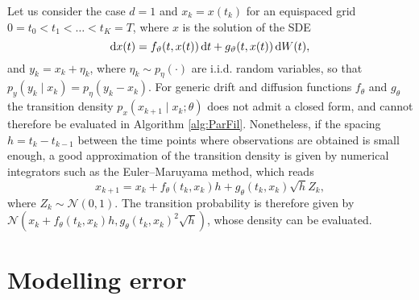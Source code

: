 \documentclass[10pt]{article}
\begin{document}
Let us consider the case $d = 1$ and $x_k = x(t_k)$ for an equispaced grid $0 = t_0 < t_1 < \ldots < t_K = T$, where $x$ is the solution of the SDE
\begin{equation}\label{eq:GenSDE}
	\mathrm{d} x(t) = f_\vartheta(t, x(t)) \,\mathrm{d} t + g_\vartheta(t, x(t)) \,\mathrm{d} W(t),
\end{equation}
and $y_k = x_k + \eta_k$, where $\eta_k \sim p_\eta(\cdot)$ are i.i.d. random variables, so that $p_y(y_k \mid x_k) = p_\eta(y_k - x_k)$. For generic drift and diffusion functions $f_\theta$ and $g_\theta$ the transition density $p_x(x_{k+1} \mid x_k; \theta)$ does not admit a closed form, and cannot therefore be evaluated in Algorithm \ref{alg:ParFil}. Nonetheless, if the spacing $h = t_k - t_{k-1}$ between the time points where observations are obtained is small enough, a good approximation of the transition density is given by numerical integrators such as the Euler--Maruyama method, which reads
\begin{equation}
	x_{k+1} = x_k + f_{\theta}(t_k, x_k) h + g_\theta(t_k, x_k) \sqrt{h} Z_k,
\end{equation}
where $Z_k \sim \mathcal N(0, 1)$. The transition probability is therefore given by $\mathcal N(x_k + f_{\theta}(t_k, x_k) h, g_\theta(t_k, x_k)^2 \sqrt{h})$, whose density can be evaluated. 

\section{Modelling error}

\end{document}
